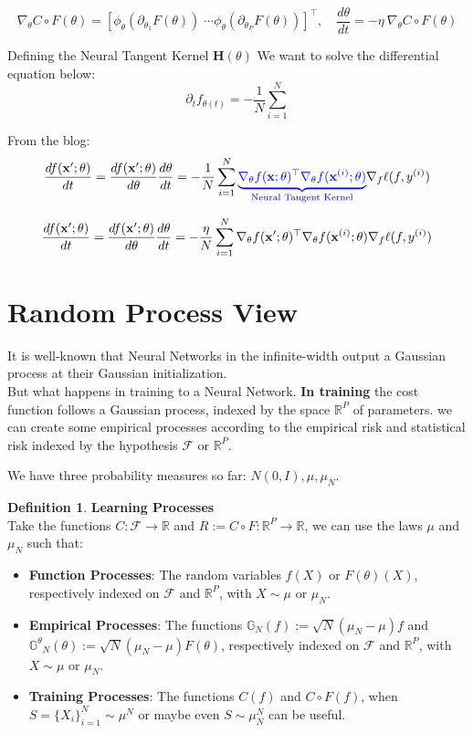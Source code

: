 \documentclass[11pt, a4paper]{article}
\theoremstyle{definition}
\newtheorem{definition}[theorem]{Definition}
\theoremstyle{remark}
\newcommand{\R}{\mathbb{R}}
\newcommand{\bH}{\mathbf{H}}
\begin{document}
 \[\nabla_\theta C\circ F(\theta)  = [ \phi_\theta(\partial_{\theta_1}F(\theta)) \; \cdots \phi_\theta(\partial_{\theta_P}F(\theta)) ]^\top 
 ,\quad
 \frac{d \theta}{d t} = - \eta \ \nabla_\theta C\circ F(\theta)
 \]

Defining the Neural Tangent Kernel \(\bH(\theta)\)
We want to solve the differential equation below:
\[
\partial_{t} f_{\theta(t)} = - \frac{1}{N} \sum_{i=1}^{N} 
\]



From the blog:
	\[
\frac{df(\mathbf{x}';\theta)}{dt} 
= \frac{df(\mathbf{x}';\theta)}{d\theta}\frac{d\theta}{dt}
= -\frac{1}{N} \sum_{i=1}^N \color{blue}{\underbrace{\nabla_\theta f(\mathbf{x};\theta)^\top \nabla_\theta f(\mathbf{x}^{(i)}; \theta)}_\text{Neural Tangent Kernel}    } \color{black}{\nabla_f \ell(f, y^{(i)})}
	\]
	
	\[
	\frac{df(\mathbf{x}';\theta)}{dt} 
	= \frac{df(\mathbf{x}';\theta)}{d\theta}\frac{d\theta}{dt}
	= -\frac{\eta}{N} \sum_{i=1}^N \nabla_\theta f(\mathbf{x}';\theta)^\top \nabla_\theta f(\mathbf{x}^{(i)}; \theta) \color{black}{\nabla_f \ell(f, y^{(i)})}
	\]
	
	\section{Random Process View}
	
	It is well-known that Neural Networks in the infinite-width output a Gaussian process at their Gaussian initialization.\\
	But what happens in training to a Neural Network.
\textbf{In training} the cost function follows a Gaussian process, indexed by the space \(\R^P\) of parameters. we can create some empirical processes according to the empirical risk and statistical risk indexed by the hypothesis \(\mathcal{F}\) or \(\R^P\).
 
We have three probability measures so far: \(N(0,I), \mu, \mu_N\).
\begin{definition}{\textbf{Learning Processes}}\\
Take the functions \(C:\mathcal{F}\to \R\) and \(R:= C\circ F : \R^P \to \R\), we can use the laws \(\mu\) and \(\mu_N\) such that:
\begin{itemize}
	\item \textbf{Function Processes}: The random variables \(f(X)\) or \(F(\theta)(X)\), respectively indexed on \(\mathcal{F}\) and \(\R^P\), with \(X\sim\mu\) or \(\mu_N\).
	
	\item \textbf{Empirical Processes}: The functions \(\mathbb{G}_N(f):=\sqrt{N}(\mu_N - \mu)f\) and  \(\mathbb{G^\theta}_N(\theta):=\sqrt{N}(\mu_N - \mu)F(\theta)\), respectively indexed on \(\mathcal{F}\) and \(\R^P\), with \(X\sim\mu\) or \(\mu_N\).
	
	\item \textbf{Training Processes}: The functions \(C(f)\) and \(C \circ F(f)\), when \(S=\{X_i\}_{i=1}^N \sim \mu^N\) or maybe even \(S\sim \mu_N^N\) can be useful.
	
	
\end{itemize}
\end{definition}
\end{document}
